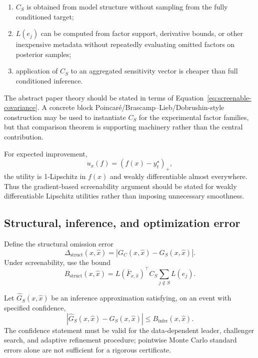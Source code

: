 \begin{enumerate}
    \item $C_S$ is obtained from model structure without sampling from the fully
          conditioned target;
    \item $L(e_j)$ can be computed from factor support, derivative bounds, or
          other inexpensive metadata without repeatedly evaluating omitted
          factors on posterior samples;
    \item application of $C_S$ to an aggregated sensitivity vector is cheaper
          than full conditioned inference.
\end{enumerate}

The abstract paper theory should be stated in terms of
Equation~\eqref{eq:screenable-covariance}.  A concrete block
Poincar\'e/Brascamp--Lieb/Dobrushin-style construction may be used to instantiate
$C_S$ for the experimental factor families, but that comparison theorem is
supporting machinery rather than the central contribution.

For expected improvement,
\[
    u_x(f)=(f(x)-y_t^\star)_+,
\]
the utility is 1-Lipschitz in $f(x)$ and weakly differentiable almost
everywhere.  Thus the gradient-based screenability argument should be stated
for weakly differentiable Lipschitz utilities rather than imposing unnecessary
smoothness.

\subsection{Structural, inference, and optimization error}

Define the structural omission error
\[
    \Delta_{\mathrm{struct}}(x,\widehat x)
    = |G_C(x,\widehat x)-G_S(x,\widehat x)|.
\]
Under screenability, use the bound
\begin{equation}
    B_{\mathrm{struct}}(x,\widehat x)
    =
    L(\bar F_{x,\widehat x})^\top C_S
    \sum_{j\notin S}L(e_j).
    \label{eq:structural-bound}
\end{equation}

Let $\widehat G_S(x,\widehat x)$ be an inference approximation satisfying,
on an event with specified confidence,
\begin{equation}
    |\widehat G_S(x,\widehat x)-G_S(x,\widehat x)|
    \le B_{\mathrm{infer}}(x,\widehat x).
    \label{eq:inference-interface}
\end{equation}
The confidence statement must be valid for the data-dependent leader,
challenger search, and adaptive refinement procedure; pointwise Monte Carlo
standard errors alone are not sufficient for a rigorous certificate.

